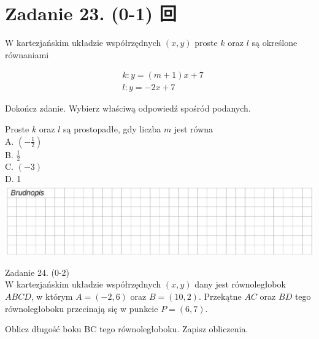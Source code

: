 \documentclass[10pt]{article}
\begin{document}
\section*{Zadanie 23. (0-1) 回}
W kartezjańskim układzie współrzędnych \((x, y)\) proste \(k\) oraz \(l\) są określone równaniami

\[
\begin{aligned}
& k: y=(m+1) x+7 \\
& l: y=-2 x+7
\end{aligned}
\]

Dokończ zdanie. Wybierz właściwą odpowiedź spośród podanych.

Proste \(k\) oraz \(l\) są prostopadłe, gdy liczba \(m\) jest równa\\
A. \(\left(-\frac{1}{2}\right)\)\\
B. \(\frac{1}{2}\)\\
C. \((-3)\)\\
D. 1\\
\includegraphics[max width=\textwidth, center]{2024_11_21_daeb5e5efb43dd4cb535g-20(1)}

Zadanie 24. (0-2)\\
W kartezjańskim układzie współrzędnych \((x, y)\) dany jest równoległobok \(A B C D\), w którym \(A=(-2,6)\) oraz \(B=(10,2)\). Przekątne \(A C\) oraz \(B D\) tego równoległoboku przecinają się w punkcie \(P=(6,7)\).

Oblicz długość boku BC tego równoległoboku. Zapisz obliczenia.
\end{document}
